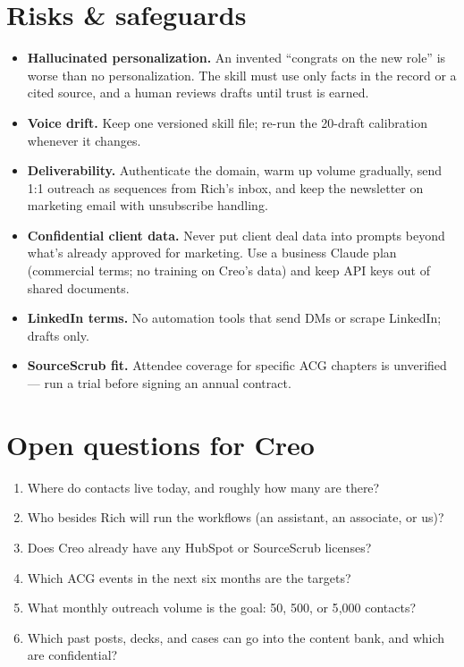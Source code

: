 \documentclass[11pt]{article}
\begin{document}
\section{Risks \& safeguards}
\begin{caution}
\begin{itemize}
  \item \textbf{Hallucinated personalization.} An invented ``congrats on the new role'' is worse
  than no personalization. The skill must use only facts in the record or a cited source, and a
  human reviews drafts until trust is earned.
  \item \textbf{Voice drift.} Keep one versioned skill file; re-run the 20-draft calibration
  whenever it changes.
  \item \textbf{Deliverability.} Authenticate the domain, warm up volume gradually, send 1:1
  outreach as sequences from Rich's inbox, and keep the newsletter on marketing email with
  unsubscribe handling.
  \item \textbf{Confidential client data.} Never put client deal data into prompts beyond what's
  already approved for marketing. Use a business Claude plan (commercial terms; no training on
  Creo's data) and keep API keys out of shared documents.
  \item \textbf{LinkedIn terms.} No automation tools that send DMs or scrape LinkedIn; drafts only.
  \item \textbf{SourceScrub fit.} Attendee coverage for specific ACG chapters is unverified ---
  run a trial before signing an annual contract.
\end{itemize}
\end{caution}

\section{Open questions for Creo}
\begin{enumerate}
  \item Where do contacts live today, and roughly how many are there?
  \item Who besides Rich will run the workflows (an assistant, an associate, or us)?
  \item Does Creo already have any HubSpot or SourceScrub licenses?
  \item Which ACG events in the next six months are the targets?
  \item What monthly outreach volume is the goal: 50, 500, or 5{,}000 contacts?
  \item Which past posts, decks, and cases can go into the content bank, and which are
  confidential?
\end{enumerate}
\end{document}
